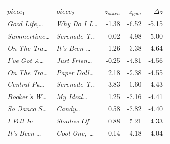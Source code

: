 \begin{tabular}{llrrr}
\toprule
$piece_1$ & $piece_2$ & $z_{stitch}$ & $z_{ppm}$ & $\Delta z$ \\
\midrule
\textit{Good Life,\dots} & \textit{Why Do I L\dots} & -1.38 & -6.52 & -5.15 \\
\textit{Summertime\dots} & \textit{Serenade T\dots} & 0.02 & -4.98 & -5.00 \\
\textit{On The Tra\dots} & \textit{It's Been \dots} & 1.26 & -3.38 & -4.64 \\
\textit{I've Got A\dots} & \textit{Just Frien\dots} & -0.25 & -4.81 & -4.56 \\
\textit{On The Tra\dots} & \textit{Paper Doll\dots} & 2.18 & -2.38 & -4.55 \\
\textit{Central Pa\dots} & \textit{Serenade T\dots} & 3.83 & -0.60 & -4.43 \\
\textit{Booker's W\dots} & \textit{My Ideal\dots} & 1.25 & -3.16 & -4.41 \\
\textit{So Danco S\dots} & \textit{Candy\dots} & 0.58 & -3.82 & -4.40 \\
\textit{I Fall In \dots} & \textit{Shadow Of \dots} & -0.88 & -5.21 & -4.33 \\
\textit{It's Been \dots} & \textit{Cool One, \dots} & -0.14 & -4.18 & -4.04 \\
\bottomrule
\end{tabular}
